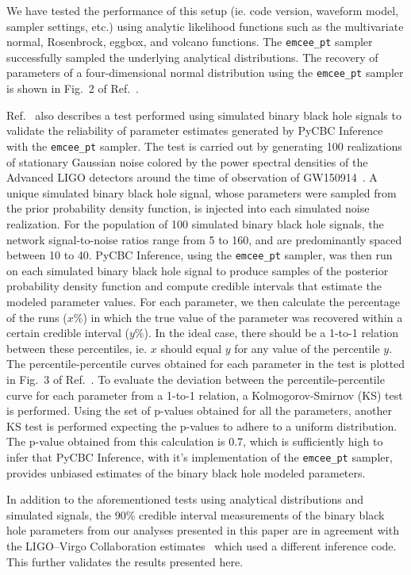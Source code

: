 We have tested the performance of this setup (ie. code version, waveform model, sampler settings, etc.) using analytic likelihood functions such as the multivariate normal, Rosenbrock, eggbox, and volcano functions. The \texttt{emcee\_pt} sampler successfully sampled the underlying analytical distributions. The recovery of parameters of a four-dimensional normal distribution using the \texttt{emcee\_pt} sampler is shown in Fig.~2 of Ref.~\cite{Biwer:2018osg}.

Ref.~\cite{Biwer:2018osg} also describes a test performed using simulated binary black hole signals to validate the reliability of parameter estimates generated by PyCBC Inference with the \texttt{emcee\_pt} sampler. The test is carried out by generating 100 realizations of stationary Gaussian noise colored by the power spectral densities of the Advanced LIGO detectors around the time of observation of GW150914~\cite{Abbott:2016blz}. A unique simulated binary black hole signal, whose parameters were sampled from the prior probability density function, is injected into each simulated noise realization. For the population of 100 simulated binary black hole signals, the network signal-to-noise ratios range from 5 to 160, and are predominantly spaced between 10 to 40. PyCBC Inference, using the \texttt{emcee\_pt} sampler, was then run on each simulated binary black hole signal to produce samples of the posterior probability density function and compute credible intervals that estimate the modeled parameter values. For each parameter, we then calculate the percentage of the runs ($x\%$) in which the true value of the parameter was recovered within a certain credible interval ($y\%$). In the ideal case, there should be a 1-to-1 relation between these percentiles, ie. $x$ should equal $y$ for any value of the percentile $y$. The percentile-percentile curves obtained for each parameter in the test is plotted in Fig.~3 of Ref.~\cite{Biwer:2018osg}. To evaluate the deviation between the percentile-percentile curve for each parameter from a 1-to-1 relation, a Kolmogorov-Smirnov (KS) test is performed. Using the set of p-values obtained for all the parameters, another KS test is performed expecting the p-values to adhere to a uniform distribution. The p-value obtained from this calculation is 0.7, which is sufficiently high to infer that PyCBC Inference, with it's implementation of the \texttt{emcee\_pt} sampler, provides unbiased estimates of the binary black hole modeled parameters.

In addition to the aforementioned tests using analytical distributions and simulated signals, the 90\% credible interval measurements of the binary black hole parameters from our analyses presented in this paper are in agreement with the LIGO--Virgo Collaboration estimates~\cite{Abbott:2017vtc,Abbott:2017gyy,Abbott:2017oio} which used a different inference code. This further validates the results presented here.

